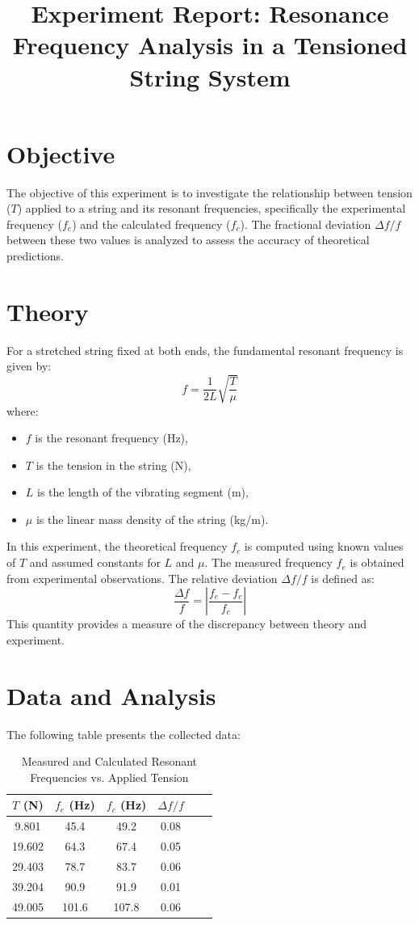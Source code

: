\documentclass[12pt]{article}
\title{Experiment Report: Resonance Frequency Analysis in a Tensioned String System}
\author{}
\date{}
\begin{document}
\maketitle

\section*{Objective}
The objective of this experiment is to investigate the relationship between tension (\(T\)) applied to a string and its resonant frequencies, specifically the experimental frequency (\(f_e\)) and the calculated frequency (\(f_c\)). The fractional deviation \(\Delta f / f\) between these two values is analyzed to assess the accuracy of theoretical predictions.

\section*{Theory}
For a stretched string fixed at both ends, the fundamental resonant frequency is given by:
\[
f = \frac{1}{2L} \sqrt{\frac{T}{\mu}}
\]
where:
\begin{itemize}
  \item \(f\) is the resonant frequency (Hz),
  \item \(T\) is the tension in the string (N),
  \item \(L\) is the length of the vibrating segment (m),
  \item \(\mu\) is the linear mass density of the string (kg/m).
\end{itemize}

In this experiment, the theoretical frequency \(f_c\) is computed using known values of \(T\) and assumed constants for \(L\) and \(\mu\). The measured frequency \(f_e\) is obtained from experimental observations. The relative deviation \(\Delta f / f\) is defined as:
\[
\frac{\Delta f}{f} = \left| \frac{f_e - f_c}{f_c} \right|
\]
This quantity provides a measure of the discrepancy between theory and experiment.

\section*{Data and Analysis}

The following table presents the collected data:

\begin{table}[H]
\centering
\caption{Measured and Calculated Resonant Frequencies vs. Applied Tension}
\label{tab:data}
\begin{tabular}{cccccc}
\toprule
\(T\) (N) & \(f_e\) (Hz) & \(f_c\) (Hz) & \(\Delta f / f\) \\
\midrule
9.801 & 45.4 & 49.2 & 0.08 \\
19.602 & 64.3 & 67.4 & 0.05 \\
29.403 & 78.7 & 83.7 & 0.06 \\
39.204 & 90.9 & 91.9 & 0.01 \\
49.005 & 101.6 & 107.8 & 0.06 \\
\bottomrule
\end{tabular}
\end{table}
\end{document}
